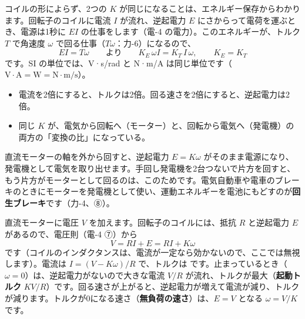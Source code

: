 コイルの形によらず、2つの $K$ が同じになることは、エネルギー保存からわかります。回転子のコイルに電流 $I$ が流れ、逆起電力 $E$ にさからって電荷を運ぶとき、電源は1秒に $EI$ の仕事をします（電-4 の電力）。このエネルギーが、トルク $T$ で角速度 $\omega$ で回る仕事（$T\omega$：力-6）になるので、
\[EI=T\omega\qquad\text{より}\qquad K_E\,\omega I=K_T\,I\,\omega,\qquad K_E=K_T\]
です。SI の単位では、V·s/rad と N·m/A は同じ単位です（$\text{V}\cdot\text{A}=\text{W}=\text{N}\cdot\text{m/s}$）。

\begin{phflow}
\end{phflow}

\begin{phyomi}[$T=KI$、$E=K\omega$]
\begin{itemize}[leftmargin=1.2\zw, itemsep=1pt, topsep=1pt, label={\color{bkTheme}●}]
\item 電流を2倍にすると、トルクは2倍。回る速さを2倍にすると、逆起電力は2倍。
\item 同じ $K$ が、電気から回転へ（モーター）と、回転から電気へ（発電機）の両方の「変換の比」になっている。
\end{itemize}
\end{phyomi}

直流モーターの軸を外から回すと、逆起電力 $E=K\omega$ がそのまま電源になり、発電機として電気を取り出せます。手回し発電機を2台つないで片方を回すと、もう片方がモーターとして回るのは、このためです。電気自動車や電車のブレーキのときにモーターを発電機として使い、運動エネルギーを電池にもどすのが\textbf{回生ブレーキ}です（力-4、⑧）。

\label{ph:電-12:sec4}
直流モーターに電圧 $V$ を加えます。回転子のコイルには、抵抗 $R$ と逆起電力 $E$ があるので、電圧則（電-4 ⑦）から
\[V=RI+E=RI+K\omega\]
です（コイルのインダクタンスは、電流が一定なら効かないので、ここでは無視します）。電流は $I=(V-K\omega)/R$ で、トルクは
です。\label{ph:電-12:dcmotor}止まっているとき（$\omega=0$）は、逆起電力がないので大きな電流 $V/R$ が流れ、トルクが最大（\textbf{起動トルク} $KV/R$）です。回る速さが上がると、逆起電力が増えて電流が減り、トルクが減ります。トルクが0になる速さ（\textbf{無負荷の速さ}）は、$E=V$ となる $\omega=V/K$ です。

